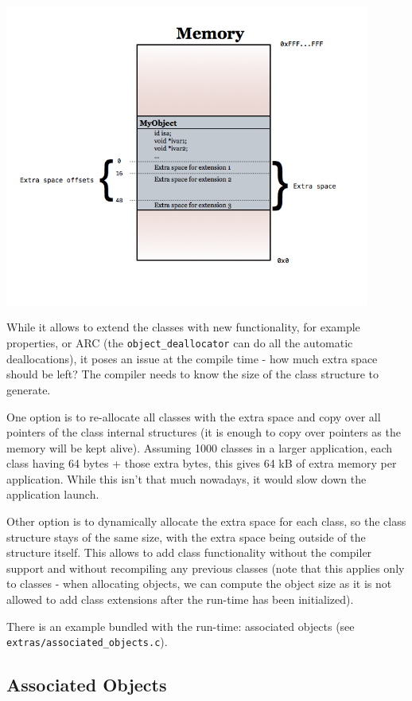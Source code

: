 \includegraphics[width=120mm]{img/class_extensions.png}

While it allows to extend the classes with new functionality, for example properties, or ARC (the \verb=object_deallocator= can do all the automatic deallocations), it poses an issue at the compile time - how much extra space should be left? The compiler needs to know the size of the class structure to generate.

One option is to re-allocate all classes with the extra space and copy over all pointers of the class internal structures (it is enough to copy over pointers as the memory will be kept alive). Assuming 1000 classes in a larger application, each class having 64 bytes + those extra bytes, this gives 64 kB of extra memory per application. While this isn't that much nowadays, it would slow down the application launch.

Other option is to dynamically allocate the extra space for each class, so the class structure stays of the same size, with the extra space being outside of the structure itself. This allows to add class functionality without the compiler support and without recompiling any previous classes (note that this applies only to classes - when allocating objects, we can compute the object size as it is not allowed to add class extensions after the run-time has been initialized).

There is an example bundled with the run-time: associated objects (see \verb=extras/associated_objects.c=).

\subsection{Associated Objects}

